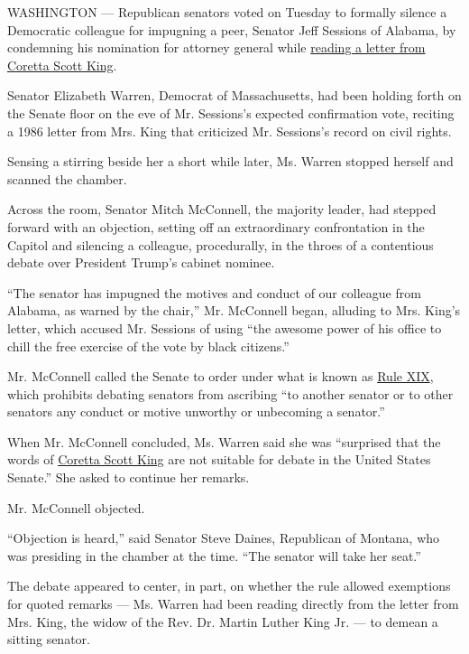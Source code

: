 WASHINGTON --- Republican senators voted on Tuesday to formally silence
a Democratic colleague for impugning a peer, Senator Jeff Sessions of
Alabama, by condemning his nomination for attorney general while
\href{https://www.documentcloud.org/documents/3259988-Scott-King-1986-Letter-and-Testimony-Signed.html\#document/p1}{reading
a letter from Coretta Scott King}.

Senator Elizabeth Warren, Democrat of Massachusetts, had been holding
forth on the Senate floor on the eve of Mr. Sessions's expected
confirmation vote, reciting a 1986 letter from Mrs. King that criticized
Mr. Sessions's record on civil rights.

Sensing a stirring beside her a short while later, Ms. Warren stopped
herself and scanned the chamber.

Across the room, Senator Mitch McConnell, the majority leader, had
stepped forward with an objection, setting off an extraordinary
confrontation in the Capitol and silencing a colleague, procedurally, in
the throes of a contentious debate over President Trump's cabinet
nominee.

``The senator has impugned the motives and conduct of our colleague from
Alabama, as warned by the chair,'' Mr. McConnell began, alluding to Mrs.
King's letter, which accused Mr. Sessions of using ``the awesome power
of his office to chill the free exercise of the vote by black
citizens.''

Mr. McConnell called the Senate to order under what is known as
\href{http://www.rules.senate.gov/public/index.cfm?p=RuleXIX}{Rule XIX},
which prohibits debating senators from ascribing ``to another senator or
to other senators any conduct or motive unworthy or unbecoming a
senator.''

When Mr. McConnell concluded, Ms. Warren said she was ``surprised that
the words of
\href{http://www.nytimes.com/2006/01/31/national/coretta-scott-king-78-widow-of-dr-martin-luther-king-jr-dies.html}{Coretta
Scott King} are not suitable for debate in the United States Senate.''
She asked to continue her remarks.

Mr. McConnell objected.

``Objection is heard,'' said Senator Steve Daines, Republican of
Montana, who was presiding in the chamber at the time. ``The senator
will take her seat.''

The debate appeared to center, in part, on whether the rule allowed
exemptions for quoted remarks --- Ms. Warren had been reading directly
from the letter from Mrs. King, the widow of the Rev. Dr. Martin Luther
King Jr. --- to demean a sitting senator.

